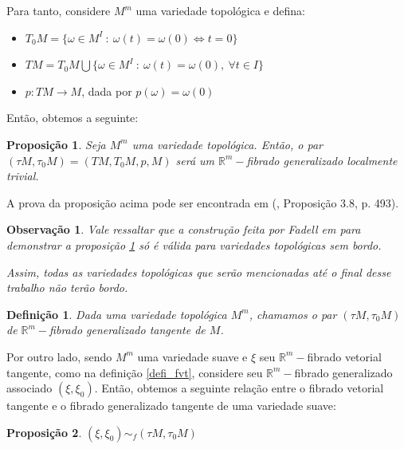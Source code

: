 \documentclass[12pt,oneside]{book} %
\newtheorem{defi}   {\hspace{0.5cm}Defini\c c\~ao}[chapter]
\newtheorem{prop}   {\hspace{0.5cm}Proposi\c c\~ao}[chapter]
\newtheorem{obs}    {\hspace{0.5cm}Observa\c{c}\~{a}o}[chapter]
\newcommand{\R}{\mathbb{R}}
\begin{document}
\par Para tanto, considere $M^{m}$ uma variedade topológica e defina:

\begin{itemize}
	\item $T_{0}M=\{ \omega\in M^{I} \ : \ \omega(t)=\omega(0) \Leftrightarrow t=0 \}$
	\item $TM=T_{0}M \bigcup \{ \omega\in M^{I} \ : \ \omega(t)=\omega(0), \ \forall t\in I \}$
	\item $p:TM\to M$, dada por $p(\omega)=\omega(0)$
\end{itemize}

\par Então, obtemos a seguinte:

\begin{prop}\label{fgt}
	Seja $M^{m}$ uma variedade topológica. Então, o par $(\tau M,\tau_{0}M)=(TM,T_{0}M,p,M)$ será um $\R^{m}-$fibrado generalizado localmente trivial.
\end{prop}

\par A prova da proposição acima pode ser encontrada em (\cite{fadell_1}, Proposição 3.8, p. 493).

\begin{obs}\label{obs_varied_bordo}
	Vale ressaltar que a construção feita por Fadell em \cite{fadell_1} para demonstrar a proposição \ref{fgt} só é válida para variedades topológicas sem bordo.
	\par Assim, todas as variedades topológicas que serão mencionadas até o final desse trabalho não terão bordo.
\end{obs}

\begin{defi}
	Dada uma variedade topológica $M^{m}$, chamamos o par $(\tau M,\tau_{0}M)$ de $\R^{m}-$fibrado generalizado tangente de $M$.
\end{defi}

\par Por outro lado, sendo $M^{m}$ uma variedade suave e $\xi$ seu $\R^{m}-$fibrado vetorial tangente, como na definição \ref{defi_fvt}, considere seu $\R^{m}-$fibrado generalizado associado $(\xi,\xi_{0})$. Então, obtemos a seguinte relação entre o fibrado vetorial tangente e o fibrado generalizado tangente de uma variedade suave:

\begin{prop}\label{fht_tang}
	$(\xi,\xi_{0})\sim_{f} (\tau M,\tau_{0}M)$
\end{prop}
\end{document}
